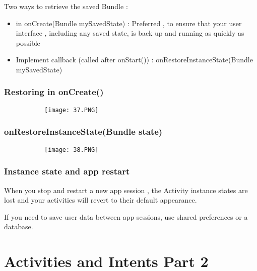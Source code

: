 \documentclass{article}
\begin{document}
  Two ways to retrieve the saved Bundle : 

  \begin{itemize}
      \item in onCreate(Bundle mySavedState) : Preferred , to ensure that your user interface , including any saved state, is back up and running as quickly as possible
      \item Implement callback (called after onStart()) : onRestoreInstanceState(Bundle mySavedState)
  \end{itemize}


  \subsubsection{Restoring in onCreate()}

            \begin{figure}[ht!]
  \centering
  \begin{subfigure}[b]{0.5\linewidth}
    \texttt{[image: 37.PNG]}
  \end{subfigure}
  \end{figure}

  \subsubsection{onRestoreInstanceState(Bundle state)}

              \begin{figure}[ht!]
  \centering
  \begin{subfigure}[b]{0.5\linewidth}
    \texttt{[image: 38.PNG]}
  \end{subfigure}
  \end{figure}

\subsubsection{Instance state and app restart}

When you stop and restart a new app session , the Activity instance states are lost and your activities will revert to their default appearance.

If you need to save user data between app sessions, use shared preferences or a database. 


\section{Activities and Intents Part 2}
\end{document}

